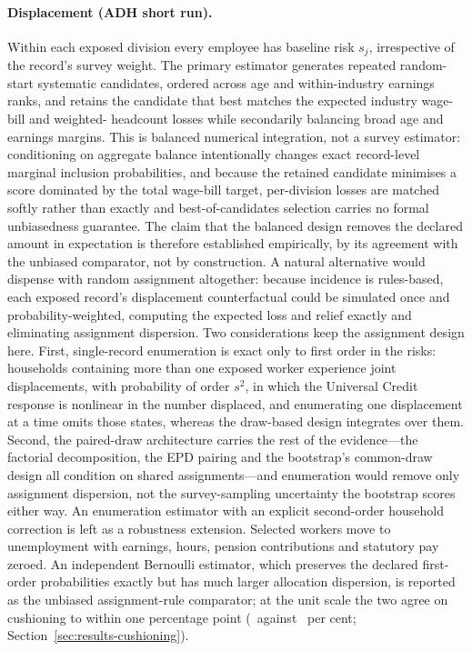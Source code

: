 \paragraph{Displacement (ADH short run).} Within each exposed division every
employee has baseline risk $s_j$, irrespective of the record's survey weight.
The primary estimator generates repeated random-start systematic candidates,
ordered across age and within-industry earnings ranks, and retains the
candidate that best matches the expected industry wage-bill and weighted-
headcount losses while secondarily balancing broad age and earnings margins.
This is balanced numerical integration, not a survey estimator: conditioning
on aggregate balance intentionally changes exact record-level marginal
inclusion probabilities, and because the retained candidate minimises a
score dominated by the total wage-bill target, per-division losses are
matched softly rather than exactly and best-of-candidates selection carries
no formal unbiasedness guarantee. The claim that the balanced design removes
the declared amount in expectation is therefore established empirically, by
its agreement with the unbiased comparator, not by construction. A natural
alternative would dispense with random assignment altogether: because
incidence is rules-based, each exposed record's displacement counterfactual
could be simulated once and probability-weighted, computing the expected
loss and relief exactly and eliminating assignment dispersion. Two
considerations keep the assignment design here. First, single-record
enumeration is exact only to first order in the risks: households containing
more than one exposed worker experience joint displacements, with
probability of order $s^2$, in which the Universal Credit response is
nonlinear in the number displaced, and enumerating one displacement at a
time omits those states, whereas the draw-based design integrates over them.
Second, the paired-draw architecture carries the rest of the evidence---the
factorial decomposition, the EPD pairing and the bootstrap's common-draw
design all condition on shared assignments---and enumeration would remove
only assignment dispersion, not the survey-sampling uncertainty the
bootstrap scores either way. An enumeration estimator with an explicit
second-order household correction is left as a robustness extension. Selected
workers move to unemployment with earnings, hours, pension contributions and
statutory pay zeroed. An independent Bernoulli estimator, which preserves
the declared first-order probabilities exactly but has much larger
allocation dispersion, is reported as the unbiased assignment-rule
comparator; at the unit scale the two agree on cushioning to within one
percentage point (\BalancedUnitCushion\ against \BernoulliUnitCushion\ per
cent; Section~\ref{sec:results-cushioning}).
